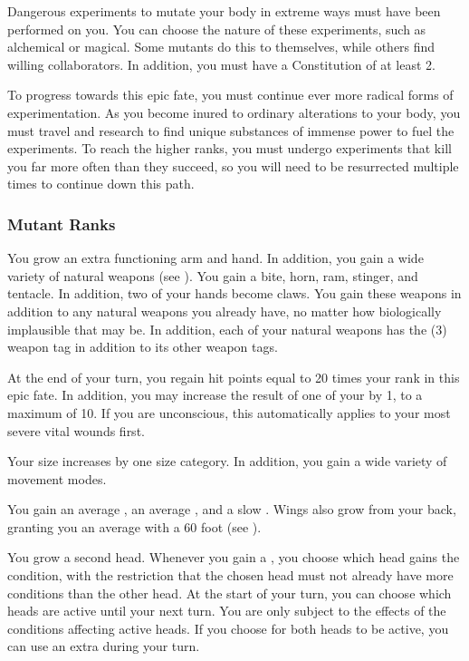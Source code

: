      Dangerous experiments to mutate your body in extreme ways must have been performed on you.
    You can choose the nature of these experiments, such as alchemical or magical.
    Some mutants do this to themselves, while others find willing collaborators.
    In addition, you must have a Constitution of at least 2.

     To progress towards this epic fate, you must continue ever more radical forms of experimentation.
    As you become inured to ordinary alterations to your body, you must travel and research to find unique substances of immense power to fuel the experiments.
    To reach the higher ranks, you must undergo experiments that kill you far more often than they succeed, so you will need to be resurrected multiple times to continue down this path.

    \subsubsection{Mutant Ranks}
       You grow an extra functioning arm and hand.
      In addition, you gain a wide variety of natural weapons (see ).
      You gain a bite, horn, ram, stinger, and tentacle.
      In addition, two of your hands become claws.
      You gain these weapons in addition to any natural weapons you already have, no matter how biologically implausible that may be.
      In addition, each of your natural weapons has the  (3) weapon tag in addition to its other weapon tags.

       At the end of your turn, you regain hit points equal to 20 times your rank in this epic fate.
      In addition, you may increase the result of one of your  by 1, to a maximum of 10.
      If you are unconscious, this automatically applies to your most severe vital wounds first.

       Your size increases by one size category.
      In addition, you gain a wide variety of movement modes.

      You gain an average , an average , and a slow .
      Wings also grow from your back, granting you an average  with a 60 foot  (see ).

       You grow a second head.
      Whenever you gain a , you choose which head gains the condition, with the restriction that the chosen head must not already have more conditions than the other head.
      At the start of your turn, you can choose which heads are active until your next turn.
      You are only subject to the effects of the conditions affecting active heads.
      If you choose for both heads to be active, you can use an extra  during your turn.

